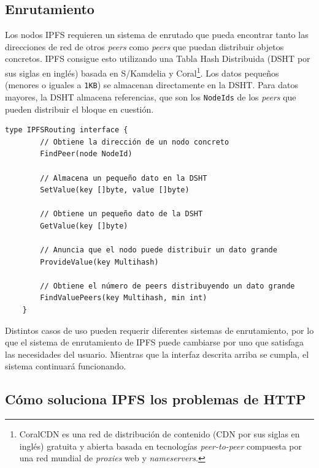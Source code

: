 \documentclass[12pt]{article} %
\begin{document}

\subsection{Enrutamiento} %
\label{sub:enrutamiento}

Los nodos IPFS requieren un sistema de enrutado que pueda encontrar tanto las direcciones de red de otros \textit{peers} como \textit{peers} que puedan distribuir objetos concretos. IPFS consigue esto utilizando una Tabla Hash Distribuida (DSHT por sus siglas en inglés) basada en S/Kamdelia y Coral\footnote{CoralCDN es una red de distribución de contenido (CDN por sus siglas en inglés) gratuita y abierta basada en tecnologías \textit{peer-to-peer} compuesta por una red mundial de \textit{proxies} web y \textit{nameservers}.}. Los datos pequeños (menores o iguales a \texttt{1KB}) se almacenan directamente en la DSHT. Para datos mayores, la DSHT almacena referencias, que son los \texttt{NodeIds} de los \textit{peers} que pueden distribuir el bloque en cuestión.

\begin{lstlisting}[caption={Interfaz de la DSHT.}, language=Golang]
	type IPFSRouting interface {
		// Obtiene la dirección de un nodo concreto
		FindPeer(node NodeId)

		// Almacena un pequeño dato en la DSHT
		SetValue(key []byte, value []byte)

		// Obtiene un pequeño dato de la DSHT
		GetValue(key []byte)

		// Anuncia que el nodo puede distribuir un dato grande
		ProvideValue(key Multihash)

		// Obtiene el número de peers distribuyendo un dato grande
		FindValuePeers(key Multihash, min int)
	}
\end{lstlisting}

Distintos casos de uso pueden requerir diferentes sistemas de enrutamiento, por lo que el sistema de enrutamiento de IPFS  puede cambiarse por uno que satisfaga las necesidades del usuario. Mientras que la interfaz descrita arriba se cumpla, el sistema continuará funcionando.


\subsection{Cómo soluciona IPFS los problemas de HTTP} %
\label{sub:cómo_soluciona_ipfs_los_problemas_de_http}
\end{document}
